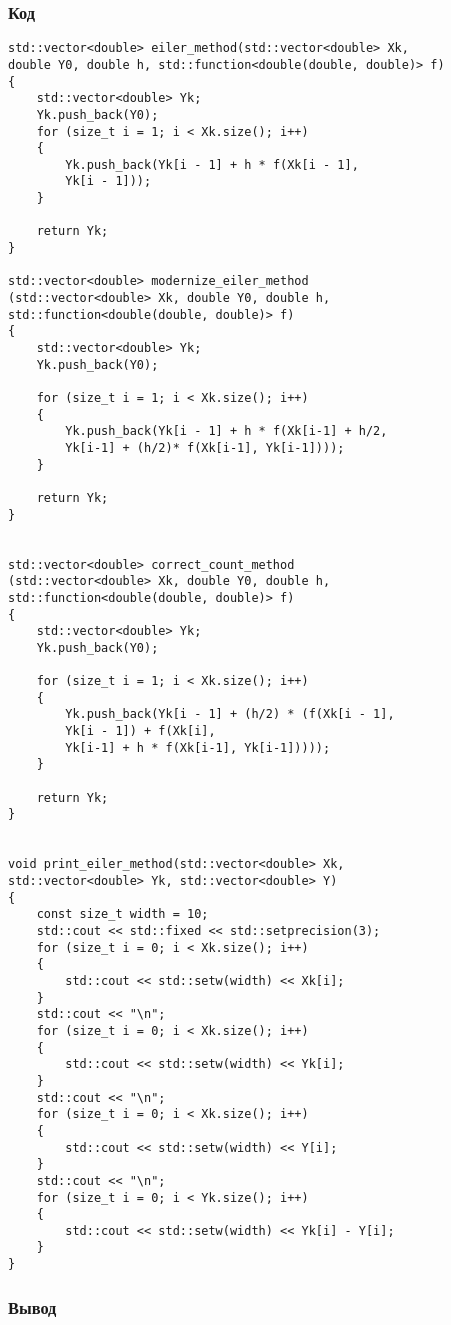 \documentclass[bachelor, och, pract]{SCWorks}
\begin{document}
\subsubsection{Код}
\begin{lstlisting}
std::vector<double> eiler_method(std::vector<double> Xk, 
double Y0, double h, std::function<double(double, double)> f)
{
    std::vector<double> Yk;
    Yk.push_back(Y0);
    for (size_t i = 1; i < Xk.size(); i++)
    {
        Yk.push_back(Yk[i - 1] + h * f(Xk[i - 1], 
        Yk[i - 1]));
    }

    return Yk;
}

std::vector<double> modernize_eiler_method
(std::vector<double> Xk, double Y0, double h, 
std::function<double(double, double)> f)
{
    std::vector<double> Yk;
    Yk.push_back(Y0);

    for (size_t i = 1; i < Xk.size(); i++)
    {
        Yk.push_back(Yk[i - 1] + h * f(Xk[i-1] + h/2, 
        Yk[i-1] + (h/2)* f(Xk[i-1], Yk[i-1])));
    }

    return Yk;
}


std::vector<double> correct_count_method
(std::vector<double> Xk, double Y0, double h,
std::function<double(double, double)> f)
{
    std::vector<double> Yk;
    Yk.push_back(Y0);

    for (size_t i = 1; i < Xk.size(); i++)
    {
        Yk.push_back(Yk[i - 1] + (h/2) * (f(Xk[i - 1], 
        Yk[i - 1]) + f(Xk[i], 
        Yk[i-1] + h * f(Xk[i-1], Yk[i-1]))));
    }

    return Yk;
}


void print_eiler_method(std::vector<double> Xk, 
std::vector<double> Yk, std::vector<double> Y)
{
    const size_t width = 10;
    std::cout << std::fixed << std::setprecision(3);
    for (size_t i = 0; i < Xk.size(); i++)
    {
        std::cout << std::setw(width) << Xk[i];
    }
    std::cout << "\n";
    for (size_t i = 0; i < Xk.size(); i++)
    {
        std::cout << std::setw(width) << Yk[i];
    }
    std::cout << "\n";
    for (size_t i = 0; i < Xk.size(); i++)
    {
        std::cout << std::setw(width) << Y[i];
    }
    std::cout << "\n";
    for (size_t i = 0; i < Yk.size(); i++)
    {
        std::cout << std::setw(width) << Yk[i] - Y[i];
    }
}
\end{lstlisting}


\subsubsection{Вывод}
\end{document}
